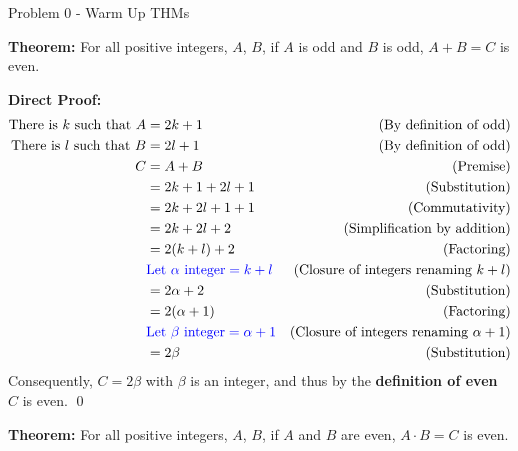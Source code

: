 \begin{problem}{Problem 0 - Warm Up THMs}
    \begin{Highlight}
        \textbf{Theorem:} For all positive integers, $A$, $B$, if $A$ is odd and $B$ is odd, $A + B = C$ is even. \vspace*{1em}

        \textbf{Direct Proof:} \newline
        \begin{align*}
            \text{There is $k$ such that } A & = 2k + 1 & \text{(By definition of odd)} \\
            \text{There is $l$ such that } B & = 2l + 1 & \text{(By definition of odd)} \\
            C & = A + B & \text{(Premise)} \\
            & = 2k + 1 + 2l + 1 & \text{(Substitution)} \\
            & = 2k + 2l + 1 + 1 & \text{(Commutativity)} \\
            & = 2k + 2l + 2 & \text{(Simplification by addition)} \\
            & = 2(k + l) + 2 & \text{(Factoring)} \\
            & \textcolor{blue}{\text{Let } \alpha \text{ integer} = k + l} & \text{(Closure of integers renaming $k + l$)} \\
            & = 2\alpha + 2 & \text{(Substitution)} \\
            & = 2(\alpha + 1) & \text{(Factoring)} \\
            & \textcolor{blue}{\text{Let } \beta \text{ integer} = \alpha + 1} & \text{(Closure of integers renaming $\alpha + 1$)} \\
            & = 2\beta & \text{(Substitution)} \\
        \end{align*}
        Consequently, $C = 2\beta$ with $\beta$ is an integer, and thus by the \textbf{definition of even} $C$ is even. \qed
    \end{Highlight}

    \begin{Highlight}
        \textbf{Theorem:} For all positive integers, $A$, $B$, if $A$ and $B$ are even, $A \cdot B = C$ is even. \vspace*{1em}


\end{Highlight}
\end{problem}
